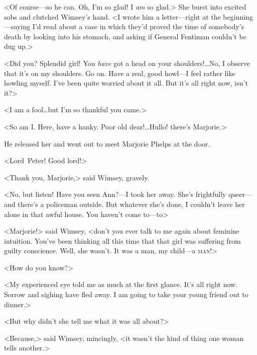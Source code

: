 <Of course—so he can. Oh, I'm so glad! I \emph{am} so glad.> She burst into excited sobs and clutched Wimsey's hand. <I wrote him a letter—right at the beginning—saying I'd read about a case in which they'd proved the time of somebody's death by looking into his stomach, and asking if General Fentiman couldn't be dug up.>

<Did you? Splendid girl! You \emph{have} got a head on your shoulders!\dots No, I observe that it's on my shoulders. Go on. Have a real, good howl—I feel rather like howling myself. I've been quite worried about it all. But it's all right now, isn't it?>

<I am a fool\dots  but I'm so thankful you came.>

<So am I\@. Here, have a hanky. Poor old dear!\dots Hullo! there's Marjorie.>

He released her and went out to meet Marjorie Phelps at the door.

<Lord~Peter! Good lord!>

<Thank you, Marjorie,> said Wimsey, gravely.

<No, but listen! Have you seen Ann?—I took her away. She's frightfully queer—and there's a policeman outside. But whatever she's done, I couldn't leave her alone in that awful house. You haven't come to—to\longdash>

<Marjorie!> said Wimsey, <don't you ever talk to me again about feminine intuition. You've been thinking all this time that that girl was suffering from guilty conscience. Well, she wasn't. It was a man, my child—a \textsc{man}!>

<How do you know?>

<My experienced eye told me as much at the first glance. It's all right now. Sorrow and sighing have fled away. I am going to take your young friend out to dinner.>

<But why didn't she tell me what it was all about?>

<Because,> said Wimsey, mincingly, <it wasn't the kind of thing one woman tells another.>
